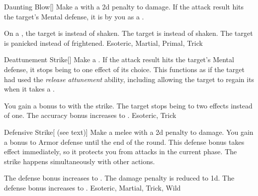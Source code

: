 \lowercase{\hypertarget{maneuver:Daunting Blow}{}}\label{maneuver:Daunting Blow}
\hypertarget{maneuver:Daunting Blow}{}
\begin{freeability}{Daunting Blow}[]
Make a  with a \minus2d penalty to damage.
If the attack result hits the target's Mental defense,
it is  by you as a .

\rankline
{} On a , the target is  instead of shaken.
 The target is  instead of shaken.
 The target is panicked instead of frightened.
 Esoteric, Martial, Primal, Trick
\end{freeability}
\vspace{0.25em}



\lowercase{\hypertarget{maneuver:Deattunement Strike}{}}\label{maneuver:Deattunement Strike}
\hypertarget{maneuver:Deattunement Strike}{}
\begin{freeability}{Deattunement Strike}[]
Make a .
If the attack result hits the target's Mental defense,
it stops being  to one effect of its choice.
This functions as if the target had used the \textit{release attunement} ability,
including allowing the target to regain its  when it takes a .

\rankline
{} You gain a  bonus to  with the strike.
 The target stops being  to two effects instead of one.
 The accuracy bonus increases to .
 Esoteric, Trick
\end{freeability}
\vspace{0.25em}



\lowercase{\hypertarget{maneuver:Defensive Strike}{}}\label{maneuver:Defensive Strike}
\hypertarget{maneuver:Defensive Strike}{}
\begin{freeability}{Defensive Strike}[ (see text)]
Make a melee  with a \minus2d penalty to damage.
You gain a  bonus to Armor defense until the end of the round.
This defense bonus takes effect immediately, so it protects you from attacks in the current phase.
The strike happens simultaneously with other actions.

\rankline
{} The defense bonus increases to .
 The damage penalty is reduced to \minus1d.
 The defense bonus increases to .
 Esoteric, Martial, Trick, Wild
\end{freeability}
\vspace{0.25em}



